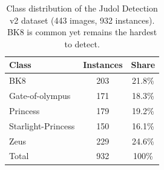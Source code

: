 \begin{table}[t]
\caption{Class distribution of the Judol Detection v2 dataset (443 images, 932 instances). BK8 is common yet remains the hardest to detect.}
\label{tab:classdist}
\centering
\footnotesize
\renewcommand{\arraystretch}{1.2}
\begin{tabular}{@{}lcc@{}}
\toprule
\textbf{Class} & \textbf{Instances} & \textbf{Share} \\
\midrule
BK8                & 203 & 21.8\% \\
Gate-of-olympus    & 171 & 18.3\% \\
Princess           & 179 & 19.2\% \\
Starlight-Princess & 150 & 16.1\% \\
Zeus               & 229 & 24.6\% \\
\midrule
Total              & 932 & 100\% \\
\bottomrule
\end{tabular}
\end{table}
